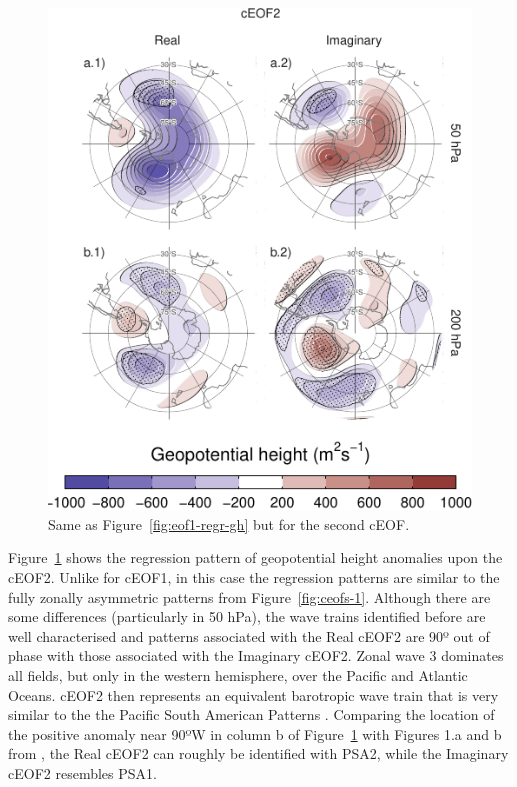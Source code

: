 \documentclass[smallextended]{svjour3}       %
\begin{document}
\begin{figure}
\centering
\includegraphics{../figures/eof2-regr-gh-1.pdf}
\caption{\label{fig:eof2-regr-gh}Same as Figure~\ref{fig:eof1-regr-gh} but for the second cEOF.}
\end{figure}

Figure~\ref{fig:eof2-regr-gh} shows the regression pattern of geopotential height anomalies upon the cEOF2. Unlike for cEOF1, in this case the regression patterns are similar to the fully zonally asymmetric patterns from Figure~\ref{fig:ceofs-1}. Although there are some differences (particularly in 50 hPa), the wave trains identified before are well characterised and patterns associated with the Real cEOF2 are 90º out of phase with those associated with the Imaginary cEOF2. Zonal wave 3 dominates all fields, but only in the western hemisphere, over the Pacific and Atlantic Oceans. cEOF2 then represents an equivalent barotropic wave train that is very similar to the the Pacific South American Patterns \citep{mo2001}.
Comparing the location of the positive anomaly near 90ºW in column b of Figure~\ref{fig:eof2-regr-gh} with Figures 1.a and b from \citet{mo2001}, the Real cEOF2 can roughly be identified with PSA2, while the Imaginary cEOF2 resembles PSA1.
\end{document}
